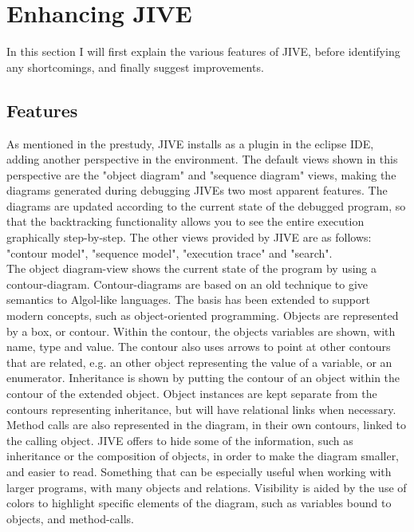 \section{Enhancing JIVE}\label{enhJive}

In this section I will first explain the various features of JIVE, before identifying any shortcomings, and finally suggest improvements.

\subsection{Features}\label{jiveFeatures}

As mentioned in the prestudy, JIVE installs as a plugin in the eclipse IDE, adding another perspective in the environment.%
The default views shown in this perspective are the "object diagram" and "sequence diagram" views, making the diagrams generated during debugging JIVEs two most apparent features.
The diagrams are updated according to the current state of the debugged program, so that the backtracking functionality allows you to see the entire execution graphically step-by-step.
The other views provided by JIVE are as follows: "contour model", "sequence model", "execution trace" and "search".
~\\

The object diagram-view shows the current state of the program by using a contour-diagram.%
Contour-diagrams are based on an old technique to  give semantics to Algol-like languages.
The basis has been extended to support modern concepts, such as object-oriented programming.
Objects are represented by a box, or contour.
Within the contour, the objects variables are shown, with name, type and value.
The contour also uses arrows to point at other contours that are related, e.g. an other object representing the value of a variable, or an enumerator.
Inheritance is shown by putting the contour of an object within the contour of the extended object. 
Object instances are kept separate from the contours representing inheritance, but will have relational links when necessary.
Method calls are also represented in the diagram, in their own contours, linked to the calling object.
JIVE offers to hide some of the information, such as inheritance or the composition of objects, in order to make the diagram smaller, and easier to read.
Something that can be especially useful when working with larger programs, with many objects and relations.
Visibility is aided by the use of colors to highlight specific elements of the diagram, such as variables bound to objects, and method-calls.
~\\

